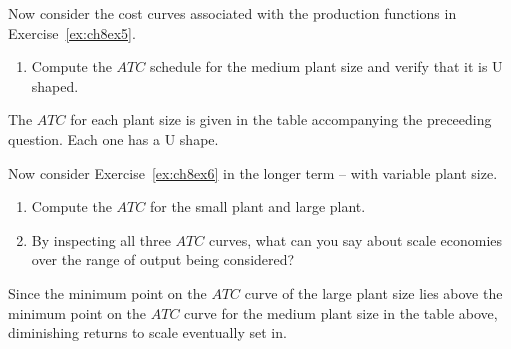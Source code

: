 \begin{enumialphparenastyle}
\begin{ex}\label{ex:ch8ex6}
Now consider the cost curves associated with the production functions in Exercise~\ref{ex:ch8ex5}.
\begin{enumerate}
	\item	Compute the $ATC$ schedule for the medium plant size and verify that it is U shaped.
\end{enumerate}
\begin{sol}
	The $ATC$ for each plant size is given in the table accompanying the preceeding question. Each one has a U shape.
	
\end{sol}
\end{ex}

\begin{ex}\label{ex:ch8ex7}
Now consider Exercise~\ref{ex:ch8ex6} in the longer term -- with variable plant size.
\begin{enumerate}
	\item	Compute the $ATC$ for the small plant and large plant.
	\item	By inspecting all three $ATC$ curves, what can you say about scale economies over the range of output being considered?
\end{enumerate}
\begin{sol}
	Since the minimum point on the $ATC$ curve of the large plant size lies above the minimum point on the $ATC$ curve for the medium plant size in the table above, diminishing returns to scale eventually set in.
	
\end{sol}
\end{ex}


\end{enumialphparenastyle}
